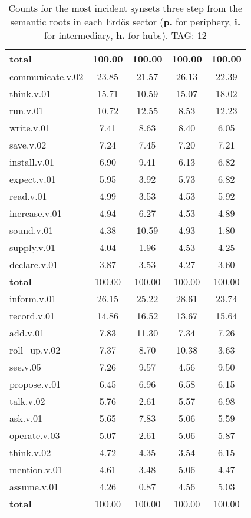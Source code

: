 \begin{table}[h!]
\begin{center}
\begin{tabular}{| l || c | c | c | c |}
{{\bf total}} & 100.00  & 100.00  & 100.00  & 100.00 \\\hline\hline\hline
communicate.v.02 & 23.85  & 21.57  & 26.13  & 22.39 \\\hline
think.v.01 & 15.71  & 10.59  & 15.07  & 18.02 \\\hline
run.v.01 & 10.72  & 12.55  & 8.53  & 12.23 \\\hline
write.v.01 & 7.41  & 8.63  & 8.40  & 6.05 \\\hline
save.v.02 & 7.24  & 7.45  & 7.20  & 7.21 \\\hline
install.v.01 & 6.90  & 9.41  & 6.13  & 6.82 \\\hline
expect.v.01 & 5.95  & 3.92  & 5.73  & 6.82 \\\hline
read.v.01 & 4.99  & 3.53  & 4.53  & 5.92 \\\hline
increase.v.01 & 4.94  & 6.27  & 4.53  & 4.89 \\\hline
sound.v.01 & 4.38  & 10.59  & 4.93  & 1.80 \\\hline
supply.v.01 & 4.04  & 1.96  & 4.53  & 4.25 \\\hline
declare.v.01 & 3.87  & 3.53  & 4.27  & 3.60 \\\hline\hline
{{\bf total}} & 100.00  & 100.00  & 100.00  & 100.00 \\\hline\hline\hline
inform.v.01 & 26.15  & 25.22  & 28.61  & 23.74 \\\hline
record.v.01 & 14.86  & 16.52  & 13.67  & 15.64 \\\hline
add.v.01 & 7.83  & 11.30  & 7.34  & 7.26 \\\hline
roll\_up.v.02 & 7.37  & 8.70  & 10.38  & 3.63 \\\hline
see.v.05 & 7.26  & 9.57  & 4.56  & 9.50 \\\hline
propose.v.01 & 6.45  & 6.96  & 6.58  & 6.15 \\\hline
talk.v.02 & 5.76  & 2.61  & 5.57  & 6.98 \\\hline
ask.v.01 & 5.65  & 7.83  & 5.06  & 5.59 \\\hline
operate.v.03 & 5.07  & 2.61  & 5.06  & 5.87 \\\hline
think.v.02 & 4.72  & 4.35  & 3.54  & 6.15 \\\hline
mention.v.01 & 4.61  & 3.48  & 5.06  & 4.47 \\\hline
assume.v.01 & 4.26  & 0.87  & 4.56  & 5.03 \\\hline\hline
{{\bf total}} & 100.00  & 100.00  & 100.00  & 100.00 \\\hline
\end{tabular}
\caption{Counts for the most incident synsets three step from the semantic roots in each Erd\"os sector ({\bf p.} for periphery, {\bf i.} for intermediary, {\bf h.} for hubs). TAG: 12}
\end{center}
\end{table}